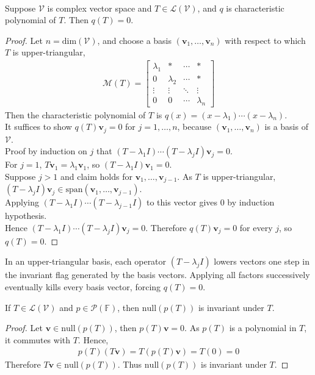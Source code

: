 \begin{theorem} \label{thm:cayleyhamiltonthm} \\
Suppose $\mathcal{V}$ is complex vector space and $T \in \mathcal{L}(\mathcal{V})$, and $q$ is characteristic polynomial of $T$. Then $q(T) = 0$.
\begin{proof} Let $n = \text{dim}(\mathcal{V})$, and choose a basis $(\mathbf{v}_1, \ldots, \mathbf{v}_n)$ with respect to which $T$ is upper-triangular,
\begin{align}
\mathcal{M}(T) =
\begin{bmatrix}
\lambda_1 & * & \cdots & * \\
0 & \lambda_2 & \cdots & * \\
\vdots & \vdots & \ddots & \vdots \\
0 & 0 & \cdots & \lambda_n
\end{bmatrix} \nonumber
\end{align}
Then the characteristic polynomial of $T$ is $q(x) = (x - \lambda_1) \cdots (x - \lambda_n)$.\\
It suffices to show $q(T) \mathbf{v}_j = 0$ for $j =1, \ldots, n$, because $(\mathbf{v}_1, \ldots, \mathbf{v}_n)$ is a basis of $\mathcal{V}$.\\
Proof by induction on $j$ that $(T - \lambda_1 I) \cdots (T - \lambda_j I) \mathbf{v}_j = 0$.\\
For $j=1$, $T \mathbf{v}_1 = \lambda_1 \mathbf{v}_1$, so $(T - \lambda_1 I) \mathbf{v}_1 = 0$.\\
Suppose $j > 1$ and claim holds for $\mathbf{v}_1, \ldots, \mathbf{v}_{j-1}$. As $T$ is upper-triangular, $(T - \lambda_j I)\mathbf{v}_j \in \text{span}(\mathbf{v}_1, \ldots, \mathbf{v}_{j-1})$.\\
Applying $(T - \lambda_1 I)\cdots (T - \lambda_{j-1} I)$ to this vector gives $0$ by induction hypothesis.\\
Hence $(T - \lambda_1 I) \cdots (T - \lambda_j I) \mathbf{v}_j = 0$. Therefore $q(T) \mathbf{v}_j = 0$ for every $j$, so $q(T) = 0$.
\end{proof}
\end{theorem}


In an upper-triangular basis, each operator $(T - \lambda_j I)$ lowers vectors one step in the invariant flag generated by the basis vectors. Applying all factors successively eventually kills every basis vector, forcing $q(T)=0$.

\begin{proposition} \label{prop:nullpolyinvariantundert} If $T \in \mathcal{L}(\mathcal{V})$ and $p \in \mathcal{P}(\mathbb{F})$, then $\text{null}(p(T))$ is invariant under $T$.
\begin{proof} Let $\mathbf{v} \in \text{null}(p(T))$, then $p(T)\mathbf{v} = 0$. As $p(T)$ is a polynomial in $T$, it commutes with $T$. Hence,
\begin{align}
p(T)(T\mathbf{v}) = T(p(T)\mathbf{v}) = T(0) = 0 \nonumber
\end{align}
Therefore $T \mathbf{v} \in \text{null}(p(T))$. Thus $\text{null}(p(T))$ is invariant under $T$.
\end{proof}
\end{proposition}

